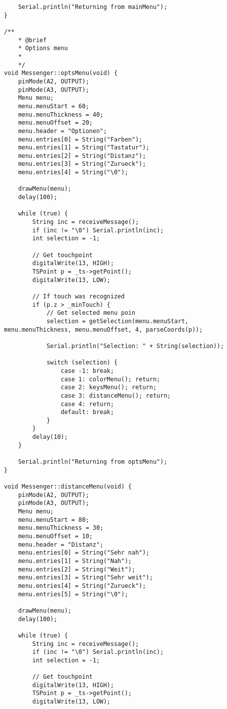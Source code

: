 \documentclass[a4paper, 11pt]{scrartcl}
\begin{document}
\begin{lstlisting}
    Serial.println("Returning from mainMenu");
}

/**
    * @brief 
    * Options menu
    * 
    */
void Messenger::optsMenu(void) {
    pinMode(A2, OUTPUT);
    pinMode(A3, OUTPUT);
    Menu menu;
    menu.menuStart = 60;
    menu.menuThickness = 40;
    menu.menuOffset = 20;
    menu.header = "Optionen";
    menu.entries[0] = String("Farben");
    menu.entries[1] = String("Tastatur");
    menu.entries[2] = String("Distanz");
    menu.entries[3] = String("Zurueck");
    menu.entries[4] = String("\0");

    drawMenu(menu);
    delay(100);

    while (true) {
        String inc = receiveMessage();
        if (inc != "\0") Serial.println(inc);
        int selection = -1;
        
        // Get touchpoint
        digitalWrite(13, HIGH);
        TSPoint p = _ts->getPoint();
        digitalWrite(13, LOW);

        // If touch was recognized
        if (p.z > _minTouch) {
            // Get selected menu poin
            selection = getSelection(menu.menuStart, menu.menuThickness, menu.menuOffset, 4, parseCoords(p));

            Serial.println("Selection: " + String(selection));
            
            switch (selection) {
                case -1: break;
                case 1: colorMenu(); return;
                case 2: keysMenu(); return;
                case 3: distanceMenu(); return;
                case 4: return;
                default: break;
            }
        }
        delay(10);
    }

    Serial.println("Returning from optsMenu");
}

void Messenger::distanceMenu(void) {
    pinMode(A2, OUTPUT);
    pinMode(A3, OUTPUT);
    Menu menu;
    menu.menuStart = 80;
    menu.menuThickness = 30;
    menu.menuOffset = 10;
    menu.header = "Distanz";
    menu.entries[0] = String("Sehr nah");
    menu.entries[1] = String("Nah");
    menu.entries[2] = String("Weit");
    menu.entries[3] = String("Sehr weit");
    menu.entries[4] = String("Zurueck");
    menu.entries[5] = String("\0");

    drawMenu(menu);
    delay(100);

    while (true) {
        String inc = receiveMessage();
        if (inc != "\0") Serial.println(inc);
        int selection = -1;
        
        // Get touchpoint
        digitalWrite(13, HIGH);
        TSPoint p = _ts->getPoint();
        digitalWrite(13, LOW);


\end{lstlisting}
\end{document}
